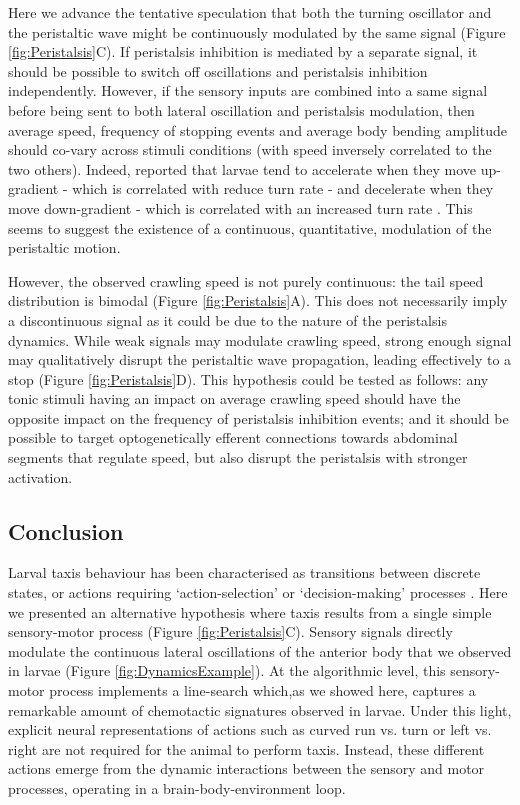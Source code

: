 \documentclass[11pt,a4paper]{article}
\newcommand{\todoBW}[1]{\todo[author=BW,color=orange, size=\tiny,inline]{#1}}
\begin{document}
Here we advance the tentative speculation that both the turning oscillator and the peristaltic wave might be continuously modulated by the same signal (Figure \ref{fig:Peristalsis}C).  If peristalsis inhibition is mediated by a separate signal, it should be possible to switch off oscillations and peristalsis inhibition independently. However, if the sensory inputs are combined into a same signal before being sent to both lateral oscillation and peristalsis modulation, then average speed, frequency of stopping events and average body bending amplitude should co-vary across stimuli conditions (with speed inversely correlated to the two others). Indeed, \cite{gomez2014multilevel} reported that larvae tend to accelerate when they move up-gradient - which is correlated with reduce turn rate \citep{schleyer2015learning} - and decelerate when they move down-gradient - which is correlated with an increased turn rate \citep{schleyer2015learning}. This seems to suggest the existence of a continuous, quantitative, modulation of the peristaltic motion. 

However, the observed crawling speed is not purely continuous: the tail speed distribution is bimodal (Figure \ref{fig:Peristalsis}A). This does not necessarily imply a discontinuous signal as it could be due to the nature of the peristalsis dynamics. While weak signals may modulate crawling speed, strong enough signal may qualitatively disrupt the peristaltic wave propagation, leading effectively to a stop (Figure \ref{fig:Peristalsis}D). This hypothesis could be tested as follows: any tonic stimuli having an impact on average crawling speed should have the opposite impact on the frequency of peristalsis inhibition events; and it should be possible to target optogenetically efferent connections towards abdominal segments that regulate speed, but also disrupt the peristalsis with stronger activation.
 

\subsection{Conclusion}
Larval taxis behaviour has been characterised as transitions between discrete states, or actions \citep{green1983organization, cobbwhatandhow1999, gomez2012active}  requiring ‘action-selection’ or ‘decision-making’ processes \citep{gomez2014multilevel}. Here we presented an alternative hypothesis where taxis results from a single simple sensory-motor process (Figure \ref{fig:Peristalsis}C). Sensory signals directly modulate the continuous lateral oscillations of the anterior body that we observed in larvae (Figure \ref{fig:DynamicsExample}). At the algorithmic level, this sensory-motor process implements a line-search \cite[see][]{snyman2005line} which,as we showed here, captures a remarkable amount of chemotactic signatures observed in larvae. Under this light, explicit neural representations of actions such as curved run vs. turn or left vs. right are not required for the animal to perform taxis. Instead, these different actions emerge from the dynamic interactions between the sensory and motor processes, operating in a brain-body-environment loop.
\end{document}
